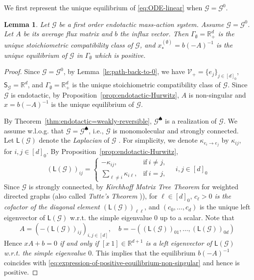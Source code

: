 \documentclass[10pt]{amsart}
\numberwithin{equation}{section}
\theoremstyle{plain}
\newtheorem{lemma}[theorem]{Lemma}
\theoremstyle{definition}
\theoremstyle{remark}
\newcommand{\cG}{\mathcal{G}}
\newcommand{\cV}{\mathcal{V}}
\begin{document}
We first represent the unique equilibrium of \eqref{eq:ODE-linear} when $\cG=\cG^0$.
\begin{lemma}\label{le:positivity-of-equilibrium}
Let $\cG$ be a first order endotactic mass-action system. Assume $\cG=\cG^0$. Let $A$ be its average flux matrix and $b$ the influx vector. Then $\Gamma_{\emptyset}=\mathbb{R}^d_+$ is the unique stoichiometric compatibility class of $\cG$, and $x^{(\emptyset)}_*=b(-A)^{-1}$
 is the unique equilibrium of $\cG$ in $\Gamma_{\emptyset}$ which is positive.
\end{lemma}
\begin{proof}

Since $\cG=\cG^0$, by Lemma~\ref{le:path-back-to-0}, we have $\cV_+=\{e_j\}_{j\in[d]_0}$, $\mathsf{S}_{\cG}=\mathbb{R}^d$, and $\Gamma_{\emptyset}=\mathbb{R}^d_+$ is the unique stoichiometric compatibility class of $\cG$. Since $\cG$ is endotactic, by Proposition~\ref{prop:endotactic-Hurwitz}, $A$ is non-singular and $x=b(-A)^{-1}$ is the unique equilibrium of $\cG$.

By Theorem~\ref{thm:endotactic=weakly-reversible}, $\cG^{\spadesuit}$ is a realization of $\cG$. We assume w.l.o.g. that $\cG=\cG^{\spadesuit}$, i.e., $\cG$ is monomolecular and strongly connected. Let $\mathsf{L}(\mathcal{G})$ denote the \emph{Laplacian} of $\mathcal{G}$ \cite{K97}. For simplicity, we denote $\kappa_{e_i\to e_j}$ by $\kappa_{ij}$, for $i,j\in[d]_0$. By Proposition~\ref{prop:endotactic-Hurwitz}, $$(\mathsf{L}(\cG))_{ij}=\begin{cases}-\kappa_{ij},& \text{if}\ i\neq j, \\
\sum_{\ell\neq i}\kappa_{i\ell},& \text{if}\ i=j,\end{cases}\quad i,j\in[d]_0$$ Since $\mathcal{G}$ is strongly connected, by \emph{Kirchhoff Matrix Tree Theorem} \cite{K1847} for weighted directed graphs (also called \emph{Tutte's Theorem} \cite{T48})), for $\ell\in[d]_0$, \emph{$c_{\ell}>0$ is the cofactor of the diagonal element $(\mathsf{L}(\cG))_{\ell \ell}$}, and $(c_0,\ldots,c_d)$ is the unique left eigenvector of $\mathsf{L}(\cG)$ w.r.t. the simple eigenvalue $0$ up to a scalar. Note that $$A=(-(\mathsf{L}(\cG))_{ij})_{i,j\in[d]},\quad b=-((\mathsf{L}(\cG))_{01},\ldots,(\mathsf{L}(\cG))_{0d})$$ Hence \emph{$xA+b=0$ if and only if $[x\ 1]\in\mathbb{R}^{d+1}$ is a left eigenvector of $\mathsf{L}(\cG)$ w.r.t. the simple eigenvalue $0$}. This implies that  the equilibrium $b(-A)^{-1}$ coincides with \eqref{eq:expression-of-positive-equilibrium-non-singular} and hence is positive.
\end{proof}
\end{document}
